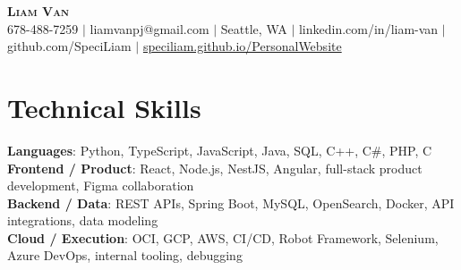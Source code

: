 \documentclass[letterpaper,11pt]{article}
\begin{document}

%
\begin{center}
    \textbf{\Huge \scshape Liam Van} \\ \vspace{1pt}
    \small 678-488-7259 $|$ \small {liamvanpj@gmail.com} $|$ Seattle, WA
 {{$|$ linkedin.com/in/liam-van} {$|$ github.com/SpeciLiam} {$|$ \href{https://speciliam.github.io/PersonalWebsite}{speciliam.github.io/PersonalWebsite}}}

\end{center}

\section{Technical Skills}
 \begin{itemize}[leftmargin=0.15in, label={}]
    \small{\item{
     \textbf{Languages}{: Python, TypeScript, JavaScript, Java, SQL, C++, C\#, PHP, C} \\
     \textbf{Frontend / Product}{: React, Node.js, NestJS, Angular, full-stack product development, Figma collaboration} \\
     \textbf{Backend / Data}{: REST APIs, Spring Boot, MySQL, OpenSearch, Docker, API integrations, data modeling} \\
     \textbf{Cloud / Execution}{: OCI, GCP, AWS, CI/CD, Robot Framework, Selenium, Azure DevOps, internal tooling, debugging} \\
    }}
 \end{itemize}
%
\end{document}
